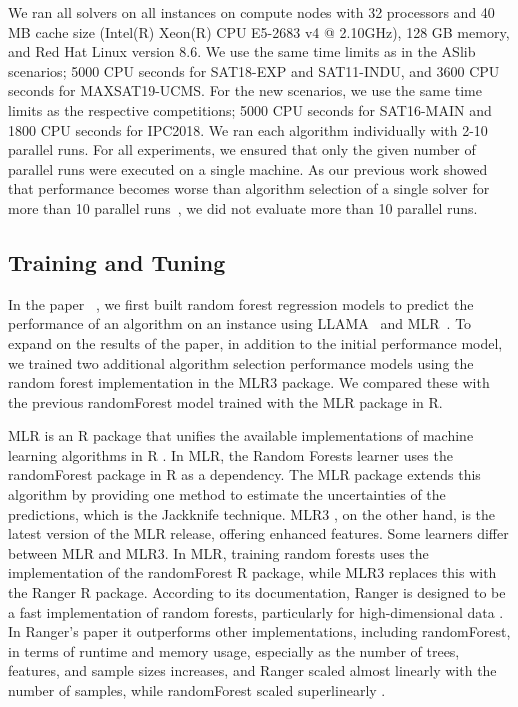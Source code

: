 We ran all solvers on all instances on compute nodes with 32 processors and 40 MB cache size (Intel(R) Xeon(R) CPU E5-2683 v4 @ 2.10GHz), 128 GB memory, and Red Hat Linux version 8.6. We use the same time limits as in the ASlib scenarios; 5000 CPU seconds for SAT18-EXP and SAT11-INDU, and 3600 CPU seconds for MAXSAT19-UCMS. For the new scenarios, we use the same time limits as the respective competitions; 5000 CPU seconds for SAT16-MAIN and 1800 CPU seconds for IPC2018. We ran each algorithm individually with 2-10 parallel runs. For all experiments, we ensured that only the given number of parallel runs were executed on a single machine. As our previous work showed that performance becomes worse than algorithm selection of a single solver for more than 10 parallel runs~\cite{pmlr-v140-kashgarani21a}, we did not evaluate more than 10 parallel runs.

\subsection{Training and Tuning}
In the paper ~\cite{kashgarani2023automatic}, we first built random forest regression models to predict the performance of an algorithm on an instance using LLAMA~\cite{LLAMA} and MLR~\cite{mlr}. To expand on the results of the paper, in addition to the initial performance model, we trained two additional algorithm selection performance models using the random forest implementation in the MLR3 package. We compared these with the previous randomForest model trained with the MLR package in R. 

MLR is an R package that unifies the available implementations of machine learning algorithms in R \cite{mlr}. In MLR, the Random Forests learner uses the randomForest package in R \cite{randomforest} as a dependency. The MLR package extends this algorithm by providing one method to estimate the uncertainties of the predictions, which is the Jackknife \cite{wager2014confidence} technique. MLR3 \cite{Bischl2024}, on the other hand, is the latest version of the MLR release, offering enhanced features. Some learners differ between MLR and MLR3. In MLR, training random forests uses the implementation of the randomForest R package, while MLR3 replaces this with the Ranger R package. According to its documentation, Ranger is designed to be a fast implementation of random forests, particularly for high-dimensional data \cite{ranger}. In Ranger's paper \cite{ranger} it outperforms other implementations, including randomForest, in terms of runtime and memory usage, especially as the number of trees, features, and sample sizes increases, and Ranger scaled almost linearly with the number of samples, while randomForest scaled superlinearly \cite{ranger}. 

